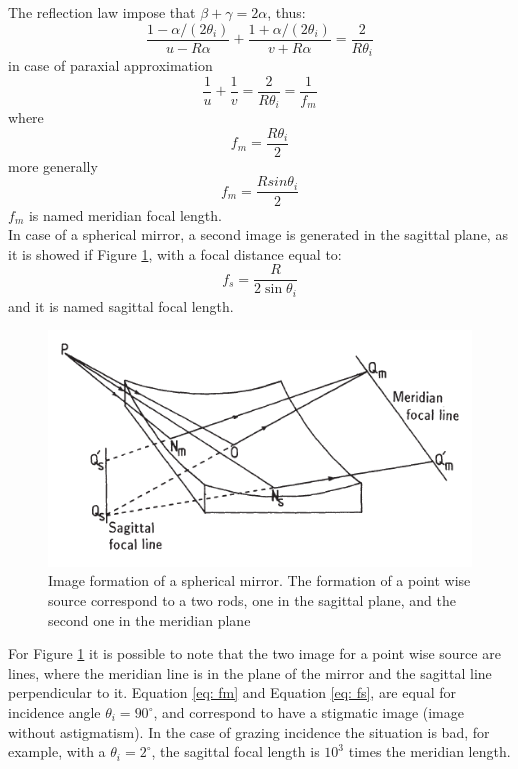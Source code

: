 \noindent The reflection law impose that $\beta + \gamma = 2 \alpha$, thus:
\begin{equation}
\frac{1 - \alpha / (2 \theta_i)}{u - R \alpha} + \frac{1 + \alpha / (2 \theta_i)}{v + R \alpha} = \frac{2}{R \theta_i}
\label{eq: refle lae}
\end{equation}
\noindent in case of paraxial approximation
\begin{equation}
\frac{1}{u} + \frac{1}{v} = \frac{2}{R \theta_i} = \frac{1}{f_m}
\label{eq: reflection law}
\end{equation}
\noindent where
\begin{equation}
f_m = \frac{R \theta_i}{2}
\label{eq: fm}
\end{equation}
\noindent more generally
\begin{equation}
f_m = \frac{R sin \theta_i}{2}
\label{eq: fm2}
\end{equation}
\noindent $f_m $ is named meridian focal length. 
\\
In case of a spherical mirror, a second image is generated in the sagittal plane, as it is showed if Figure \ref{fig: MeridianAndSagittal}, with a focal distance equal to:
\begin{equation}
f_s = \frac{R}{2 \sin \theta_i}
\label{eq: fs}
\end{equation}
\noindent and it is named sagittal focal length.
\begin{figure}[]
%
\centering
%
\includegraphics[width=.6\textwidth]{Immagini/Chapter2/MeridianAndSagittal}
%
\caption{Image formation of a spherical mirror. The formation of a point wise source correspond to a two rods, one in the sagittal plane, and the second one in the meridian plane}
%
\label{fig: MeridianAndSagittal}
%
\end{figure}
\noindent For Figure \ref{fig: MeridianAndSagittal} it is possible to note that the two image for a point wise source are lines, where the meridian line is in the plane of the mirror and the sagittal line perpendicular to it. Equation \ref{eq: fm} and Equation \ref{eq: fs}, are equal for incidence angle $\theta_i = 90^{\circ} $, and correspond to have a stigmatic image (image without astigmatism). In the case of grazing incidence the situation is bad, for example, with a $\theta_i = 2^{\circ} $, the sagittal focal length is $10^3$ times the meridian length.
